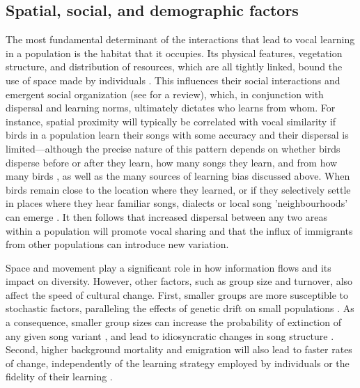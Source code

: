 \subsection{Spatial, social, and demographic factors}
The most fundamental determinant of the interactions that lead to vocal learning in a population is the habitat that it occupies. Its physical features, vegetation structure, and distribution of resources, which are all tightly linked, bound the use of space made by individuals \autocite{spiegel2016, albery2021, firth2016}. This influences their social interactions and emergent social organization (see \cite{he2019} for a review), which, in conjunction with dispersal and learning norms, ultimately dictates who learns from whom. For instance, spatial proximity will typically be correlated with vocal similarity if birds in a population learn their songs with some accuracy and their dispersal is limited---although the precise nature of this pattern depends on whether birds disperse before or after they learn, how many songs they learn, and from how many birds \autocite{ellers2003,williams1990}, as well as the many sources of learning bias discussed above. When birds remain close to the location where they learned, or if they selectively settle in places where they hear familiar songs, dialects or local song 'neighbourhoods' can emerge \autocite{podos2007}. It then follows that increased dispersal between any two areas within a population will promote vocal sharing and that the influx of immigrants from other populations can introduce new variation.

Space and movement play a significant role in how information flows and its impact on diversity. However, other factors, such as group size and turnover, also affect the speed of cultural change. First, smaller groups are more susceptible to stochastic factors, paralleling the effects of genetic drift on small populations \autocite{kimura1964}. As a consequence, smaller group sizes can increase the probability of extinction of any given song variant \autocite{nunn2009}, and lead to idiosyncratic changes in song structure \autocite{lachlan2013}. Second, higher background mortality and emigration will also lead to faster rates of change, independently of the learning strategy employed by individuals or the fidelity of their learning \autocite{nunn2009,Slater1986}.

